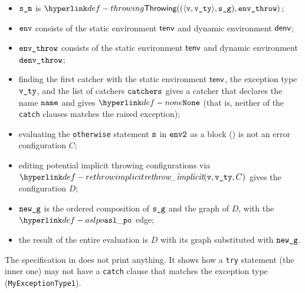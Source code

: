 \ProseParagraph
\AllApply
\begin{itemize}
  \item $\sm$ is $\Throwing((\langle \vv, \vvty \rangle, \sg), \envthrow)$;
  \item $\env$ consists of the static environment $\tenv$ and dynamic environment $\denv$;
  \item $\envthrow$ consists of the static environment $\tenv$ and dynamic environment \\ $\denvthrow$;
  \item finding the first catcher with the static environment $\tenv$, the exception type $\vvty$,
  and the list of catchers $\catchers$ gives a catcher that declares the name $\name$ and gives $\None$
  (that is, neither of the \texttt{catch} clauses matches the raised exception);
  \item evaluating the \texttt{otherwise} statement $\vs$ in $\envtwo$ as a block ()
  is not an error configuration $C$\ProseOrError;
  \item editing potential implicit throwing configurations via $\rethrowimplicit(\vv, \vvty, C)$
  gives the configuration $D$;
  \item $\newg$ is the ordered composition of $\sg$ and the graph of $D$,
  with the $\aslpo$ edge;
  \item the result of the entire evaluation is $D$ with its graph substituted with $\newg$.
\end{itemize}

\FormallyParagraph
\begin{mathpar}
\end{mathpar}

The specification in  does not print anything.
It shows how a \texttt{try} statement (the inner one) may not have a \texttt{catch} clause
that matches the exception type (\texttt{MyExceptionType1}).

